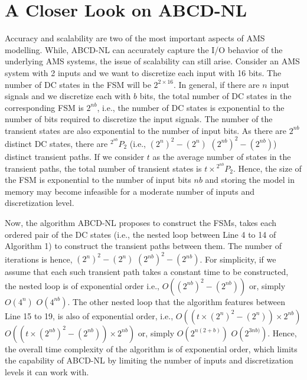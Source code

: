 \documentclass[a4paper]{article}
\newcommand*{\Perm}[2]{{}^{#1}\!P_{#2}}%
\begin{document}
\section{A Closer Look on ABCD-NL}\label{sec:closer}
Accuracy and scalability are two of the most important aspects of AMS modelling. While, ABCD-NL can accurately capture the I/O behavior of the underlying AMS systems, the issue of  scalability can still arise. Consider an AMS system with 2 inputs and we want to discretize each input with 16 bits. The number of DC states in the FSM will be $2^{2 \times 16}$. In general, if there are $n$ input signals and we discretize each with $b$ bits, the total number of DC states in the corresponding FSM is $2^{nb}$, i.e., the number of DC states is exponential to the number of bits required to discretize the input signals. The number of the transient states are also exponential to the number of input bits. As there are $2^{nb}$ distinct DC states, there are $\Perm{2^{nb}}{2}$ (i.e., \sout{$ (2^n)^2 - (2^n) $} $ (2^{nb})^2 - (2^{nb}) $) distinct transient paths. If we consider $t$ as the average number of states in the transient paths, the total number of transient states is $ t \times \Perm{2^{nb}}{2} $. Hence, the size of the FSM is exponential to the number of input bits $nb$ and storing the model in memory may become infeasible for a moderate number of inputs and discretization level. 

Now, the algorithm ABCD-NL proposes to construct the FSMs, takes each ordered pair of the DC states (i.e., the nested loop between Line 4 to 14 of Algorithm 1) to construct the transient paths between them. The number of iterations is hence, \sout{$ (2^n)^2 - (2^n) $} $ (2^{nb})^2 - (2^{nb}) $. For simplicity, if we assume that each such transient path takes a constant time to be constructed, the nested loop is of exponential order i.e., $O((2^{nb})^2 - (2^{nb}))$ or, simply \sout{$O(4^n)$} $O(4^{nb})$. The other nested loop that the algorithm features between Line 15 to 19, is also of exponential order, i.e., \sout{$O( (t \times (2^n)^2 - (2^n)) \times 2^{nb})$} $O( (t \times (2^{nb})^2 - (2^{nb})) \times 2^{nb})$ or, simply \sout{$O(2^{n(2+b)})$} $O(2^{3nb)})$. Hence, the overall time complexity of the algorithm is of exponential order, which limits the capability of ABCD-NL by limiting the number of inputs and discretization levels it can work with.

 
\end{document}
